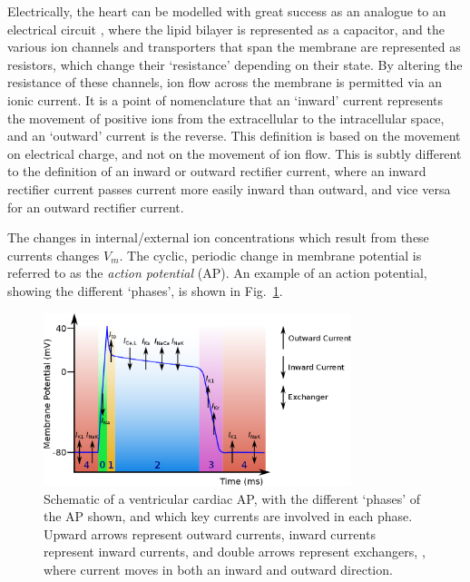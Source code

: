 \documentclass[../thesis-main.tex]{subfiles}
\begin{document}
 Electrically, the heart can be modelled with great success as an analogue to an electrical circuit \citep{Carmeliet2002}, where the lipid bilayer is represented as a capacitor, and the various ion channels and transporters that span the membrane are represented as resistors, which change their `resistance' depending on their state. By altering the resistance of these channels, ion flow across the membrane is permitted via an ionic current. It is a point of nomenclature that an `inward' current represents the movement of positive ions from the extracellular to the intracellular space, and an `outward' current is the reverse. This definition is based on the movement on electrical charge, and not on the movement of ion flow. This is subtly different to the definition of an inward or outward rectifier current, where an inward rectifier current passes current more easily inward than outward, and vice versa for an outward rectifier current.
 
 The changes in internal/external ion concentrations which result from these currents changes $V_m$. The cyclic, periodic change in membrane potential is referred to as the \emph{action potential} (AP). An example of an action potential, showing the different `phases', is shown in Fig.~\ref{fig:ap-structure}. 
 \begin{figure}
  \centering
  \includegraphics[width=0.8\textwidth]{ap-structure-full}
  \caption[Schematic of a cardiac AP]{Schematic of a ventricular cardiac AP, with the different `phases' of the AP shown, and which key currents are involved in each phase. Upward arrows represent outward currents, inward currents represent inward currents, and double arrows represent exchangers, \idest, where current moves in both an inward and outward direction.}
  \label{fig:ap-structure}
 \end{figure}
 
\end{document}
